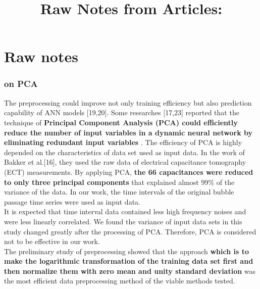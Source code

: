 \documentclass[a4paper,12pt]{article}
\title{\navy \textbf{Raw Notes from Articles: \color{black}}}%
\date{}
\newcommand\bk{\color{black}}
\newcommand\red{\color{red}}
\numberwithin{equation}{section} %
\begin{document}
\section*{Raw notes}
\subsubsection*{\citep{LIN2003611} on PCA}
The preprocessing could improve not only training efficiency but also prediction capability of ANN models [19,20]. Some researches [17,23] reported that the technique of \red \textbf{Principal Component Analysis (PCA) could efficiently reduce the number of input variables in a dynamic neural network by eliminating redundant input variables} \bk. The efficiency of PCA is highly depended on the characteristics of data set used as input data. In the work of Bakker et al.[16], they used the raw data of electrical capacitance tomography (ECT) measurements. By applying PCA, \red \textbf{the 66 capacitances were reduced to only three principal components} \bk that explained almost 99\% of the variance of the data. In our work, the time intervals of the original bubble passage time series were used as input data. \\
It is expected that time interval data contained less high frequency noises and were less linearly correlated. We found the variance of input data sets in this study changed greatly after the processing of PCA. Therefore, PCA is considered not to be effective in our work.\\
The preliminary study of preprocessing showed that the approach \red \textbf{which is to make the logarithmic transformation of the training data set first and then normalize them with zero mean and unity  standard deviation} \bk was the most efficient data preprocessing method of the viable methods tested.

\newpage 



\end{document}
